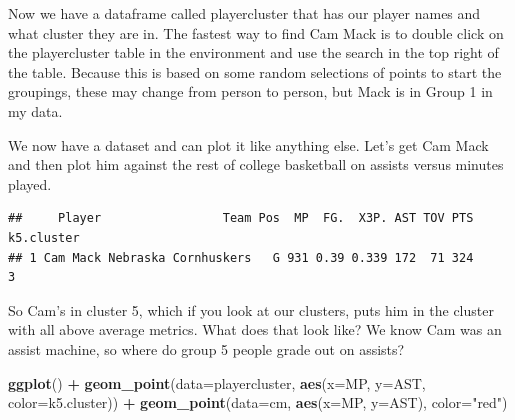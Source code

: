 \documentclass[
]{book}
\newenvironment{Shaded}{\begin{snugshade}}{\end{snugshade}}
\newcommand{\DataTypeTok}[1]{\textcolor[rgb]{0.13,0.29,0.53}{#1}}
\newcommand{\KeywordTok}[1]{\textcolor[rgb]{0.13,0.29,0.53}{\textbf{#1}}}
\newcommand{\NormalTok}[1]{#1}
\newcommand{\OperatorTok}[1]{\textcolor[rgb]{0.81,0.36,0.00}{\textbf{#1}}}
\newcommand{\StringTok}[1]{\textcolor[rgb]{0.31,0.60,0.02}{#1}}
\begin{document}
\begin{Shaded}
\end{Shaded}

Now we have a dataframe called playercluster that has our player names and what cluster they are in. The fastest way to find Cam Mack is to double click on the playercluster table in the environment and use the search in the top right of the table. Because this is based on some random selections of points to start the groupings, these may change from person to person, but Mack is in Group 1 in my data.

We now have a dataset and can plot it like anything else. Let's get Cam Mack and then plot him against the rest of college basketball on assists versus minutes played.

\begin{Shaded}
\end{Shaded}

\begin{verbatim}
##     Player                 Team Pos  MP  FG.  X3P. AST TOV PTS k5.cluster
## 1 Cam Mack Nebraska Cornhuskers   G 931 0.39 0.339 172  71 324          3
\end{verbatim}

So Cam's in cluster 5, which if you look at our clusters, puts him in the cluster with all above average metrics. What does that look like? We know Cam was an assist machine, so where do group 5 people grade out on assists?

\begin{Shaded}
\begin{Highlighting}[]
\KeywordTok{ggplot}\NormalTok{() }\OperatorTok{+}\StringTok{ }
\StringTok{  }\KeywordTok{geom_point}\NormalTok{(}\DataTypeTok{data=}\NormalTok{playercluster, }\KeywordTok{aes}\NormalTok{(}\DataTypeTok{x=}\NormalTok{MP, }\DataTypeTok{y=}\NormalTok{AST, }\DataTypeTok{color=}\NormalTok{k5.cluster)) }\OperatorTok{+}\StringTok{ }
\StringTok{  }\KeywordTok{geom_point}\NormalTok{(}\DataTypeTok{data=}\NormalTok{cm, }\KeywordTok{aes}\NormalTok{(}\DataTypeTok{x=}\NormalTok{MP, }\DataTypeTok{y=}\NormalTok{AST), }\DataTypeTok{color=}\StringTok{"red"}\NormalTok{)}
\end{Highlighting}
\end{Shaded}
\end{document}
